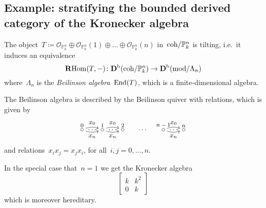 \documentclass[10pt,a4paper]{article}
\begin{document}
\subsection{Example: stratifying the bounded derived category of the Kronecker algebra}
\begin{theorem}[Beilinson]
  The object~$T\coloneqq\mathcal{O}_{\mathbb{P}_k^n}\oplus\mathcal{O}_{\mathbb{P}_k^n}(1)\oplus\ldots\oplus\mathcal{O}_{\mathbb{P}_k^n}(n)$ in~$\mathrm{coh}/\mathbb{P}_k^n$ is tilting, i.e.\ it induces an equivalence
  \begin{equation}
    \operatorname{\mathbf{R}Hom}(T,-)\colon\mathbf{D}^{\mathrm{b}}(\mathrm{coh}/\mathbb{P}_k^n)\to\mathbf{D}^{\mathrm{b}}(\mathrm{mod}/\Lambda_n)
  \end{equation}
  where~$\Lambda_n$ is the \emph{Beilinson algebra}~$\operatorname{End}(T)$, which is a finite-dimensional algebra.
\end{theorem}
The Beilinson algebra is described by the Beilinson quiver with relations, which is given by
\begin{equation}
  \begin{tikzpicture}[shorten >= 2pt, shorten <= 2pt]
    \node (v0) {};
    \node (v1) [right of = v0] {};
    \node (v2) [right of = v1] {};
    \node (v3) [right of = v2] {\ldots};
    \node (vn1) [right of = v3] {};
    \node (vn) [right of = vn1] {};

    \draw (v0)  circle (2pt) node [above] {\footnotesize 0};
    \draw (v1)  circle (2pt) node [above] {\footnotesize 1};
    \draw (v2)  circle (2pt) node [above] {\footnotesize 2};
    \draw (vn1) circle (2pt) node [above] {\footnotesize $n-1$};
    \draw (vn)  circle (2pt) node [above] {\footnotesize $n$};

    \path[->] (v0) edge [bend left = 20]  node [above] {\small $x_0$} (v1);
    \path[->] (v0) edge [bend right = 20] node [below] {\small $x_n$} (v1);
    \path (v0) -- (v1) node[midway] {$\hdots$};
    \path[->] (v1) edge [bend left = 20]  node [above] {\small $x_0$} (v2);
    \path[->] (v1) edge [bend right = 20] node [below] {\small $x_n$} (v2);
    \path (v1) -- (v2) node[midway] {$\hdots$};
    \path[->] (vn1) edge [bend left = 20]  node [above] {\small $x_0$} (vn);
    \path[->] (vn1) edge [bend right = 20] node [below] {\small $x_n$} (vn);
    \path (vn1) -- (vn) node[midway] {$\hdots$};
  \end{tikzpicture}
\end{equation}
and relations~$x_ix_j=x_jx_i$, for all~$i,j=0,\dotsc,n$.

In the special case that~$n=1$ we get the Kronecker algebra
\begin{equation}
  \begin{bmatrix} k & k^2 \\ 0 & k \end{bmatrix} 
\end{equation}
which is moreover hereditary.
\end{document}
